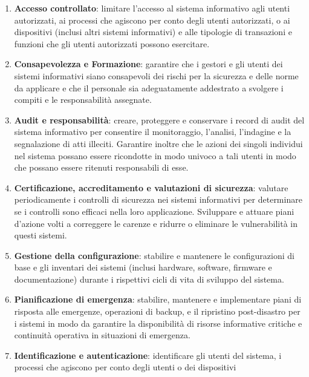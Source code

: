 \begin{enumerate}
    \item \textbf{Accesso controllato}: limitare l'accesso al sistema informativo
          agli utenti autorizzati, ai processi che agiscono per conto degli utenti
          autorizzati, o ai dispositivi (inclusi altri sistemi informativi) e alle
          tipologie di transazioni e funzioni che gli utenti autorizzati possono
          esercitare.
    \item \textbf{Consapevolezza e Formazione}: garantire che i gestori e gli
          utenti dei sistemi informativi siano consapevoli dei rischi
          per la sicurezza e delle norme da applicare e che il personale sia
          adeguatamente addestrato a svolgere i compiti e le responsabilità assegnate.
    \item \textbf{Audit e responsabilità}: creare, proteggere e conservare i
          record di audit del sistema informativo per consentire il monitoraggio,
          l'analisi, l'indagine e la segnalazione di atti illeciti. Garantire inoltre
          che le azioni dei singoli individui  nel sistema possano essere ricondotte
          in modo univoco a tali utenti in modo che possano essere ritenuti responsabili
          di esse.
    \item \textbf{Certificazione, accreditamento e valutazioni di sicurezza}:
          valutare periodicamente i controlli di sicurezza nei sistemi informativi
          per determinare se i controlli sono efficaci nella loro
          applicazione. Sviluppare e attuare piani d'azione volti a correggere le
          carenze e ridurre o eliminare le vulnerabilità in questi sistemi.
    \item \textbf{Gestione della configurazione}: stabilire e mantenere le
          configurazioni di base e gli inventari dei sistemi
          (inclusi hardware, software, firmware e documentazione) durante i
          rispettivi cicli di vita di sviluppo del sistema.
    \item \textbf{Pianificazione di emergenza}: stabilire, mantenere e
          implementare piani di risposta alle emergenze, operazioni di backup,
          e il ripristino post-disastro per i sistemi in modo da garantire la
          disponibilità di risorse informative critiche e continuità operativa
          in situazioni di emergenza.
    \item \textbf{Identificazione e autenticazione}: identificare gli utenti
          del sistema, i processi che agiscono per conto degli utenti o dei dispositivi

\end{enumerate}
